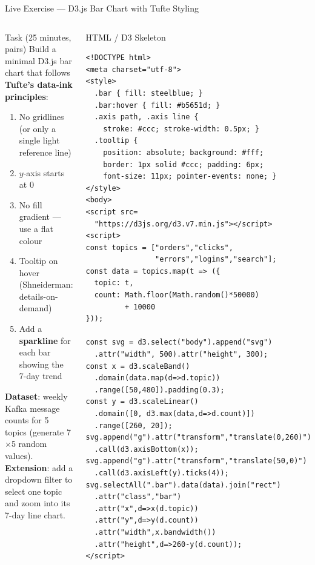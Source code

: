 \documentclass[aspectratio=169,10pt]{beamer}
\begin{document}
\begin{frame}[fragile]{Live Exercise — D3.js Bar Chart with Tufte Styling}
  \begin{columns}[T]
      \begin{block}{Task (25 minutes, pairs)}
        Build a minimal D3.js bar chart that follows
        \textbf{Tufte's data-ink principles}:
        \begin{enumerate}\setlength\itemsep{1pt}
          \item No gridlines (or only a single light reference line)
          \item $y$-axis starts at 0
          \item No fill gradient — use a flat colour
          \item Tooltip on hover (Shneiderman: details-on-demand)
          \item Add a \textbf{sparkline} for each bar showing
                the 7-day trend
        \end{enumerate}
        \textbf{Dataset}: weekly Kafka message counts for
        5 topics (generate 7$\times$5 random values).\\[4pt]
        \textbf{Extension}: add a dropdown filter to select one
        topic and zoom into its 7-day line chart.
      \end{block}

      \begin{exampleblock}{HTML / D3 Skeleton}
        \scriptsize
        \begin{verbatim}
<!DOCTYPE html>
<meta charset="utf-8">
<style>
  .bar { fill: steelblue; }
  .bar:hover { fill: #b5651d; }
  .axis path, .axis line {
    stroke: #ccc; stroke-width: 0.5px; }
  .tooltip {
    position: absolute; background: #fff;
    border: 1px solid #ccc; padding: 6px;
    font-size: 11px; pointer-events: none; }
</style>
<body>
<script src=
  "https://d3js.org/d3.v7.min.js"></script>
<script>
const topics = ["orders","clicks",
                "errors","logins","search"];
const data = topics.map(t => ({
  topic: t,
  count: Math.floor(Math.random()*50000)
         + 10000
}));

const svg = d3.select("body").append("svg")
  .attr("width", 500).attr("height", 300);
const x = d3.scaleBand()
  .domain(data.map(d=>d.topic))
  .range([50,480]).padding(0.3);
const y = d3.scaleLinear()
  .domain([0, d3.max(data,d=>d.count)])
  .range([260, 20]);
svg.append("g").attr("transform","translate(0,260)")
  .call(d3.axisBottom(x));
svg.append("g").attr("transform","translate(50,0)")
  .call(d3.axisLeft(y).ticks(4));
svg.selectAll(".bar").data(data).join("rect")
  .attr("class","bar")
  .attr("x",d=>x(d.topic))
  .attr("y",d=>y(d.count))
  .attr("width",x.bandwidth())
  .attr("height",d=>260-y(d.count));
</script>
        \end{verbatim}
      \end{exampleblock}
  \end{columns}
\end{frame}
\end{document}
